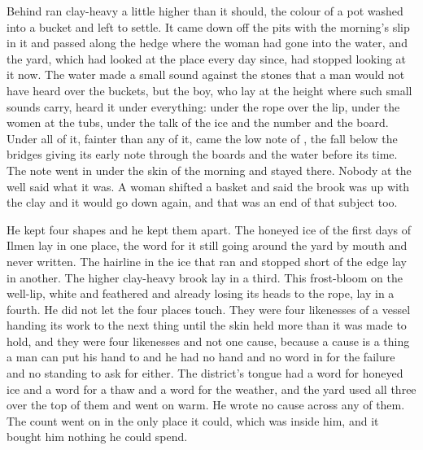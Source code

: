 Behind   ran clay-heavy a little higher than it should, the colour of a pot washed into a bucket and left to settle. It came down off the pits with the morning's slip in it and passed along the hedge where the woman had gone into the water, and the yard, which had looked at the place every day since, had stopped looking at it now. The water made a small sound against the stones that a man would not have heard over the buckets, but the boy, who lay at the height where such small sounds carry, heard it under everything: under the rope over the lip, under the women at the tubs, under the talk of the ice and the number and the board. Under all of it, fainter than any of it, came the low note of , the fall below the bridges giving its early note through the boards and the water before its time. The note went in under the skin of the morning and stayed there. Nobody at the well said what it was. A woman shifted a basket and said the brook was up with the clay and it would go down again, and that was an end of that subject too.

He kept four shapes and he kept them apart. The honeyed ice of the first days of Ilmen lay in one place, the word for it still going around the yard by mouth and never written. The hairline in the ice that ran and stopped short of the edge lay in another. The higher clay-heavy brook lay in a third. This frost-bloom on the well-lip, white and feathered and already losing its heads to the rope, lay in a fourth. He did not let the four places touch. They were four likenesses of a vessel handing its work to the next thing until the skin held more than it was made to hold, and they were four likenesses and not one cause, because a cause is a thing a man can put his hand to and he had no hand and no word in  for the failure and no standing to ask for either. The district's tongue had a word for honeyed ice and a word for a thaw and a word for the weather, and the yard used all three over the top of them and went on warm. He wrote no cause across any of them. The count went on in the only place it could, which was inside him, and it bought him nothing he could spend.

